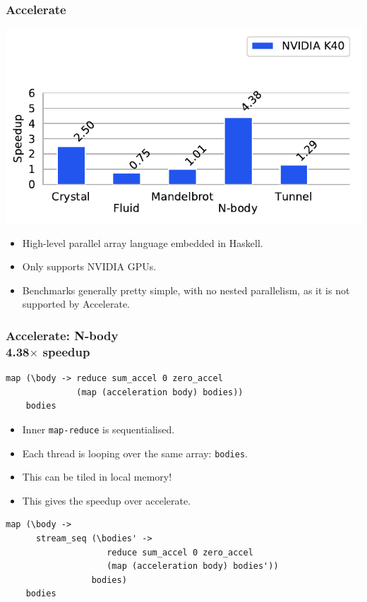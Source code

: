 \documentclass[rgb,dvipsnames]{beamer}
\begin{document}
\begin{frame}
  \frametitle{Accelerate}

  \begin{center}
    \includegraphics[scale=0.8]{img/accelerate.pdf}
  \end{center}

  \begin{itemize}
  \item High-level parallel array language embedded in Haskell.
  \item Only supports NVIDIA GPUs.
  \item Benchmarks generally pretty simple, with no nested
    parallelism, as it is not supported by Accelerate.
  \end{itemize}

\end{frame}

\begin{frame}[fragile]
  \frametitle{Accelerate: N-body \\ 4.38$\times$ speedup}

\begin{lstlisting}
map (\body -> reduce sum_accel 0 zero_accel
              (map (acceleration body) bodies))
    bodies
\end{lstlisting}

  \begin{itemize}
  \item Inner \lstinline{map-reduce} is sequentialised.
  \item Each thread is looping over the same array: \lstinline{bodies}. \pause
  \item This can be tiled in local memory!
  \item This gives the speedup over accelerate.
  \end{itemize}

\begin{lstlisting}
map (\body ->
      stream_seq (\bodies' ->
                    reduce sum_accel 0 zero_accel
                    (map (acceleration body) bodies'))
                 bodies)
    bodies
\end{lstlisting}

\end{frame}
\end{document}
